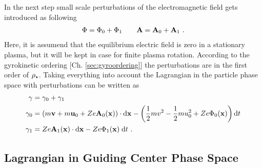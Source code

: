In the next step small scale perturbations of the electromagnetic field gets introduced as following
\begin{gather}
    \Phi = \Phi_0 + \Phi_1 \qquad \boldsymbol{\mathbf{A}} = \boldsymbol{\mathbf{A}}_0 + \boldsymbol{\mathbf{A}}_1~.
    \label{eq:electromagneticPertubation}
\end{gather}
Here, it is assumend that the equilibrium electric field is zero in a stationary plasma, but it will be kept in case for finite plasma rotation. According to the gyrokinetic ordering [Ch. \ref{sec:gyroordering}] the perturbations are in the first order of $\rho_\star$. Taking everything into account the Lagrangian in the particle phase space with perturbations can be written as
\begin{gather}
    \begin{aligned}
        \gamma   &= \gamma_0 + \gamma_1 \\
        \gamma_0 &= \left(m\boldsymbol{\mathbf{v}} + m\boldsymbol{\mathbf{u}}_0 + Ze\boldsymbol{\mathbf{A}}_0(\boldsymbol{\mathbf{x}}) \right) \cdot \mathrm{d}\boldsymbol{\mathbf{x}} - \left(\frac{1}{2}mv^2 - \frac{1}{2}mu_0^2 + Ze\Phi_0(\boldsymbol{\mathbf{x}})\right) \mathrm{d}t \\
        \gamma_1 &= Ze\boldsymbol{\mathbf{A}}_1(\boldsymbol{\mathbf{x}}) \cdot \mathrm{d}\boldsymbol{\mathbf{x}} - Ze \Phi_1(\boldsymbol{\mathbf{x}})\;\mathrm{d}t~.
    \end{aligned}
    \label{eq:particlePertubationLagrangian}
\end{gather}

\subsection{Lagrangian in Guiding Center Phase Space}
\label{sub:guidingcenterLagrangian}

